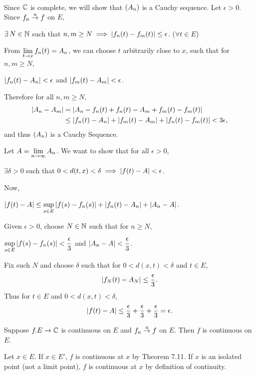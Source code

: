\pf\\
 Since \(\mathbb{C}\) is complete, we will show that \(\left( A_n \right)\) is a Cauchy sequence. Let \(\epsilon > 0\). Since \(f_n \overset{u}{\rightarrow} f\) on \(E\),
\begin{center}
    \(\exists N \in \N\) such that \(n, m\geq N \implies \left| f_n(t) - f_m(t) \right| \leq \epsilon\). (\(\forall t\in E\))
\end{center}
From \(\displaystyle \lim_{t \rightarrow x} f_n(t) = A_n\), we can choose \(t\) arbitrarily close to \(x\), such that for \(n, m \geq N\),
\begin{center}
    \(\left| f_n(t) - A_n \right| < \epsilon\) and \(\left| f_m(t) - A_m \right| < \epsilon\).
\end{center}
Therefore for all \(n, m \geq N\),
\[
    \begin{aligned}
        \left| A_n - A_m \right| &= \left| A_n - f_n(t) + f_n(t) - A_m + f_m(t) - f_m(t) \right|\\
        &\leq \left| f_n(t) - A_n \right| + \left| f_m(t) - A_m \right| + \left| f_n(t) - f_m(t) \right| < 3\epsilon,
    \end{aligned}
\]
and thus \(\left( A_n \right)\) is a Cauchy Sequence.

 Let \(A = \displaystyle \lim_{n \rightarrow \infty} A_n\). We want to show that for all \(\epsilon > 0\),
\begin{center}
    \(\exists \delta > 0\) such that \(0 < d(t, x) < \delta \implies \left| f(t) - A \right| < \epsilon\).
\end{center}
Now,
\begin{center}
    \(\displaystyle \left| f(t) - A \right| \leq \sup_{s \in E} \left| f(s) - f_n(s) \right| + \left| f_n(t) - A_n \right| + \left| A_n - A \right|\).
\end{center}
Given \(\epsilon > 0\), choose \(N \in \mathbb{N}\) such that for \(n \geq N\),
\begin{center}
    \(\displaystyle \sup_{s\in E} \left| f(s) - f_n(s) \right| < \frac{\epsilon}{3}\) and \(\displaystyle \left| A_n - A \right| < \frac{\epsilon}{3}\).
\end{center}
Fix such \(N\) and choose \(\delta\) such that for \(0 < d(x, t) < \delta\) and \(t \in E\),
\[
    \left| f_N(t) - A_N \right| \leq\frac{\epsilon}{3}.
\]
Thus for \(t\in E\) and \(0 < d(x, t) < \delta\),
\[
    \left| f(t) - A \right| \leq \frac{\epsilon}{3} + \frac{\epsilon}{3} + \frac{\epsilon}{3} = \epsilon.
\]

 Suppose \(f_: E \rightarrow \mathbb{C}\) is continuous on \(E\) and \(f_n \overset{u}{\rightarrow} f\) on \(E\). Then \(f\) is continuous on \(E\).

\pf Let \(x \in E\). If \(x \in E'\), \(f\) is continuous at \(x\) by Theorem 7.11. If \(x\) is an isolated point (not a limit point), \(f\) is continuous at \(x\) by definition of continuity.

